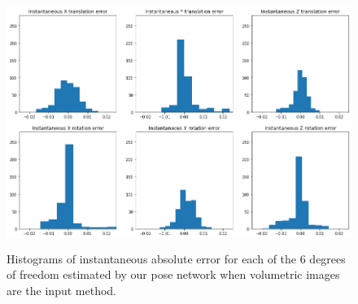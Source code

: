 \begin{figure}[H]
    \centering
    \includegraphics[width=\textwidth, height=3.2in]{images/result-examples/pose/errors/multiwarp-stack.png}
    \caption{Histograms of instantaneous absolute error for each of the 6 degrees of freedom estimated by our pose network when volumetric images are the input method.}
\end{figure}



